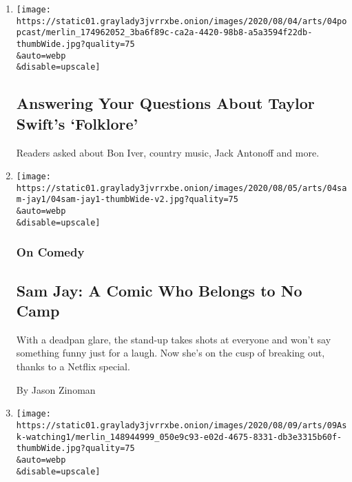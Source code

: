 \begin{enumerate}
\def\labelenumi{\arabic{enumi}.}
\item
  \href{/2020/08/04/arts/music/taylor-swift-folklore-questions.html}{}

  \texttt{[image: https://static01.graylady3jvrrxbe.onion/images/2020/08/04/arts/04popcast/merlin\_174962052\_3ba6f89c-ca2a-4420-98b8-a5a3594f22db-thumbWide.jpg?quality=75\\\&auto=webp\\\&disable=upscale]}

  \hypertarget{answering-your-questions-about-taylor-swifts-folklore}{%
  \subsection{Answering Your Questions About Taylor Swift's
  `Folklore'}\label{answering-your-questions-about-taylor-swifts-folklore}}

  Readers asked about Bon Iver, country music, Jack Antonoff and more.
\item
  \href{/2020/08/04/arts/television/sam-jay-netflix-special.html}{}

  \texttt{[image: https://static01.graylady3jvrrxbe.onion/images/2020/08/05/arts/04sam-jay1/04sam-jay1-thumbWide-v2.jpg?quality=75\\\&auto=webp\\\&disable=upscale]}

  \hypertarget{on-comedy}{%
  \subsubsection{On Comedy}\label{on-comedy}}

  \hypertarget{sam-jay-a-comic-who-belongs-to-no-camp}{%
  \subsection{Sam Jay: A Comic Who Belongs to No
  Camp}\label{sam-jay-a-comic-who-belongs-to-no-camp}}

  With a deadpan glare, the stand-up takes shots at everyone and won't
  say something funny just for a laugh. Now she's on the cusp of
  breaking out, thanks to a Netflix special.

  By Jason Zinoman
\item
  \href{/2020/08/04/arts/television/the-good-fight-the-split.html}{}

  \texttt{[image: https://static01.graylady3jvrrxbe.onion/images/2020/08/09/arts/09Ask-watching1/merlin\_148944999\_050e9c93-e02d-4675-8331-db3e3315b60f-thumbWide.jpg?quality=75\\\&auto=webp\\\&disable=upscale]}


\end{enumerate}
